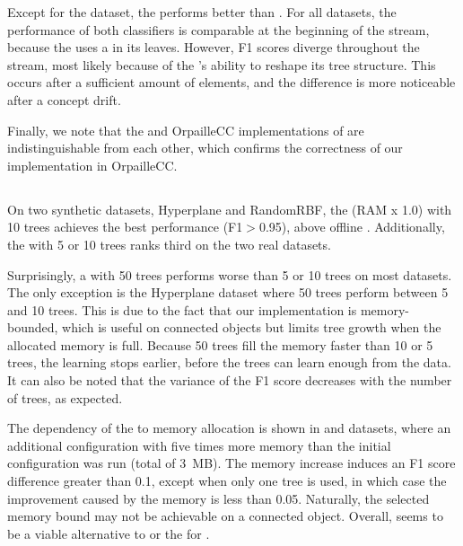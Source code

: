 Except for the \banosdataset dataset, the \hoeffdingtree performs better
than \naivebayes. For all datasets, the performance of both classifiers is
comparable at the beginning of the stream, because the \hoeffdingtree uses
a \naivebayes in its leaves.  However, F1 scores diverge throughout the
stream, most likely because of the \hoeffdingtree's ability to reshape its
tree structure.  This occurs after a sufficient amount of elements, and the
difference is more noticeable after a concept drift.

Finally, we note that the \streamdmcpp and OrpailleCC implementations of
\naivebayes are indistinguishable from each other, which confirms the correctness of our
implementation in OrpailleCC.

\subsection{\mondrianforest}

On two synthetic datasets, Hyperplane and RandomRBF, the \mondrianforest (RAM x
1.0) with 10 trees achieves the best performance (F1$>$0.95), above offline
\knn.  Additionally, the \mondrianforest with 5 or 10 trees ranks third on the
two real datasets. 

Surprisingly, a \mondrianforest with 50 trees performs worse than 5 or 10
trees on most datasets. The only exception is the Hyperplane dataset where
50 trees perform between 5 and 10 trees. This is due to the fact that
our \mondrianforest implementation is memory-bounded, which is
useful on connected objects but limits tree growth when the allocated memory is
full. Because 50 trees fill the memory faster than 10 or 5 trees, the
learning stops earlier, before the trees can learn enough from the
data. It can also be noted that the variance of the F1 score decreases with
the number of trees, as expected.

The dependency of the \mondrianforest to memory allocation is shown in
\banosdataset and \recofitdataset datasets, where an additional
configuration with five times more memory than the initial configuration was run
 (total of 3~MB).  The memory increase induces an F1 score difference
greater than 0.1, except when only one tree is used, in
which case the improvement caused by the memory is less than 0.05. Naturally, the
selected memory bound may not be achievable on a connected object. Overall,
\mondrianforest seems to be a viable alternative to \naivebayes or the
\hoeffdingtree for \har.


